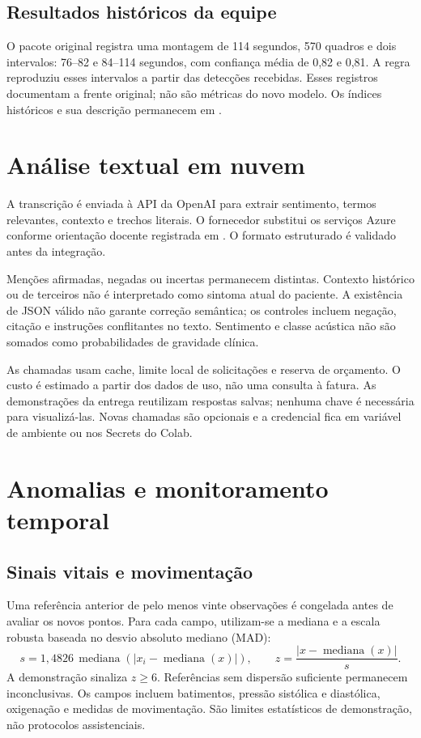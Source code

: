 \documentclass[12pt,a4paper]{article}
\begin{document}
\subsection{Resultados históricos da equipe}
O pacote original registra uma montagem de 114 segundos, 570 quadros e dois intervalos: 76--82 e 84--114 segundos, com confiança média de 0,82 e 0,81. A regra reproduziu esses intervalos a partir das detecções recebidas. Esses registros documentam a frente original; não são métricas do novo modelo. Os índices históricos e sua descrição permanecem em .

\section{Análise textual em nuvem}
A transcrição é enviada à API da OpenAI para extrair sentimento, termos relevantes, contexto e trechos literais. O fornecedor substitui os serviços Azure conforme orientação docente registrada em . O formato estruturado é validado antes da integração.

Menções afirmadas, negadas ou incertas permanecem distintas. Contexto histórico ou de terceiros não é interpretado como sintoma atual do paciente. A existência de JSON válido não garante correção semântica; os controles incluem negação, citação e instruções conflitantes no texto. Sentimento e classe acústica não são somados como probabilidades de gravidade clínica.

\ResultadoNuvem

As chamadas usam cache, limite local de solicitações e reserva de orçamento. O custo é estimado a partir dos dados de uso, não uma consulta à fatura. As demonstrações da entrega reutilizam respostas salvas; nenhuma chave é necessária para visualizá-las. Novas chamadas são opcionais e a credencial fica em variável de ambiente ou nos Secrets do Colab.

\section{Anomalias e monitoramento temporal}
\subsection{Sinais vitais e movimentação}
Uma referência anterior de pelo menos vinte observações é congelada antes de avaliar os novos pontos. Para cada campo, utilizam-se a mediana e a escala robusta baseada no desvio absoluto mediano (MAD):
\[
 s = 1{,}4826\,\operatorname{mediana}(|x_i-\operatorname{mediana}(x)|),\qquad
 z = \frac{|x-\operatorname{mediana}(x)|}{s}.
\]
A demonstração sinaliza $z\geq6$. Referências sem dispersão suficiente permanecem inconclusivas. Os campos incluem batimentos, pressão sistólica e diastólica, oxigenação e medidas de movimentação. São limites estatísticos de demonstração, não protocolos assistenciais.
\end{document}
